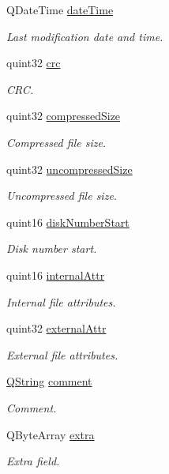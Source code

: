 \begin{DoxyCompactItemize}
Q\-Date\-Time \hyperlink{struct_qua_zip_file_info_ad6993d099436813a27fd31aebe42911a}{date\-Time}
\begin{DoxyCompactList}\small\item\em Last modification date and time. \end{DoxyCompactList}\item 
quint32 \hyperlink{struct_qua_zip_file_info_aceee045c9ebce0b9724f40d342bc99ea}{crc}
\begin{DoxyCompactList}\small\item\em C\-R\-C. \end{DoxyCompactList}\item 
quint32 \hyperlink{struct_qua_zip_file_info_af6116eaac1f36b2a4b3a6a39851a85cc}{compressed\-Size}
\begin{DoxyCompactList}\small\item\em Compressed file size. \end{DoxyCompactList}\item 
quint32 \hyperlink{struct_qua_zip_file_info_a0eb908e1b1ea637d1f1f4d6aa31db07f}{uncompressed\-Size}
\begin{DoxyCompactList}\small\item\em Uncompressed file size. \end{DoxyCompactList}\item 
quint16 \hyperlink{struct_qua_zip_file_info_aa70157fdc2bd8de10405055b4233050b}{disk\-Number\-Start}
\begin{DoxyCompactList}\small\item\em Disk number start. \end{DoxyCompactList}\item 
quint16 \hyperlink{struct_qua_zip_file_info_a36e681a93b041617addee78cb939c93d}{internal\-Attr}
\begin{DoxyCompactList}\small\item\em Internal file attributes. \end{DoxyCompactList}\item 
quint32 \hyperlink{struct_qua_zip_file_info_afeb65ffdacc4fc0ba7848d4b37f62ecf}{external\-Attr}
\begin{DoxyCompactList}\small\item\em External file attributes. \end{DoxyCompactList}\item 
\hyperlink{group___u_a_v_objects_plugin_gab9d252f49c333c94a72f97ce3105a32d}{Q\-String} \hyperlink{struct_qua_zip_file_info_adc2aad7bbd87ce3415e2a19851266bfc}{comment}
\begin{DoxyCompactList}\small\item\em Comment. \end{DoxyCompactList}\item 
Q\-Byte\-Array \hyperlink{struct_qua_zip_file_info_affc7b097de2c3c2ef5801c60f96adc72}{extra}
\begin{DoxyCompactList}\small\item\em Extra field. \end{DoxyCompactList}\end{DoxyCompactItemize}


